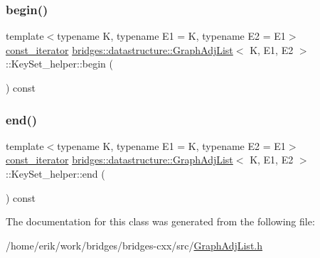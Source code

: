 \subsubsection{\texorpdfstring{begin()}{begin()}}
{\footnotesize\ttfamily template$<$typename K, typename E1 = K, typename E2 = E1$>$ \\
\hyperlink{classbridges_1_1datastructure_1_1_graph_adj_list_1_1_key_set__helper_1_1const__iterator}{const\+\_\+iterator} \hyperlink{classbridges_1_1datastructure_1_1_graph_adj_list}{bridges\+::datastructure\+::\+Graph\+Adj\+List}$<$ K, E1, E2 $>$\+::Key\+Set\+\_\+helper\+::begin (\begin{DoxyParamCaption}{ }\end{DoxyParamCaption}) const\hspace{0.3cm}{\ttfamily [inline]}}

\mbox{\label{classbridges_1_1datastructure_1_1_graph_adj_list_1_1_key_set__helper_a6204f2d6c81b2b4cc72387cbce6c4f0d}} 
\subsubsection{\texorpdfstring{end()}{end()}}
{\footnotesize\ttfamily template$<$typename K, typename E1 = K, typename E2 = E1$>$ \\
\hyperlink{classbridges_1_1datastructure_1_1_graph_adj_list_1_1_key_set__helper_1_1const__iterator}{const\+\_\+iterator} \hyperlink{classbridges_1_1datastructure_1_1_graph_adj_list}{bridges\+::datastructure\+::\+Graph\+Adj\+List}$<$ K, E1, E2 $>$\+::Key\+Set\+\_\+helper\+::end (\begin{DoxyParamCaption}{ }\end{DoxyParamCaption}) const\hspace{0.3cm}{\ttfamily [inline]}}



The documentation for this class was generated from the following file\+:\begin{DoxyCompactItemize}
\item 
/home/erik/work/bridges/bridges-\/cxx/src/\hyperlink{_graph_adj_list_8h}{Graph\+Adj\+List.\+h}\end{DoxyCompactItemize}
